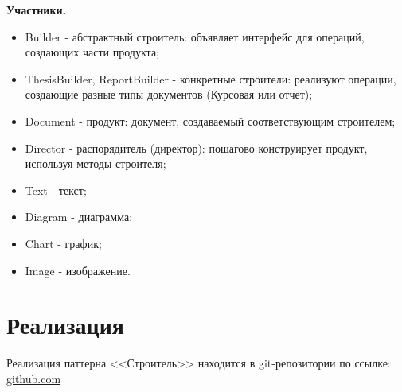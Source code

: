 \documentclass[PI,LAB]{HSEUniversity}
\begin{document}
\textbf{Участники.}
\begin{itemize}
  \item Builder - абстрактный строитель: объявляет интерфейс для операций, создающих части продукта;
  \item ThesisBuilder, ReportBuilder - конкретные строители: реализуют операции, создающие разные типы документов (Курсовая или отчет);
  \item Document - продукт: документ, создаваемый соответствующим строителем;
  \item Director - распорядитель (директор): пошагово конструирует продукт, используя методы строителя;
  \item Text - текст;
  \item Diagram - диаграмма;
  \item Chart - график;
  \item Image - изображение.
\end{itemize}

\section{Реализация}
Реализация паттерна <<Строитель>> находится в git-репозитории по ссылке: \href{https://github.com/rovany706/design-patterns/tree/master/Builder/src/com/Builder}{github.com}
\end{document}
